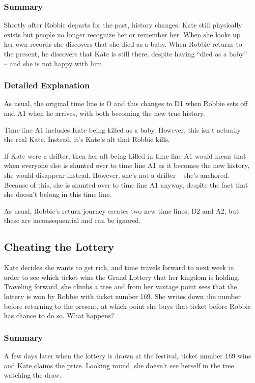 \begin{multicols*}{2}
\subsubsection{Summary}
Shortly after Robbie departs for the past, history changes. Kate still physically exists but people no longer recognize her or remember her. When she looks up her own records she discovers that she died as a baby. When Robbie returns to the present, he discovers that Kate is still there, despite having “died as a baby” – and she is not happy with him.

\subsubsection{Detailed Explanation}
As usual, the original time line is O and this changes to D1 when Robbie sets off and A1 when he arrives, with both becoming the new true history.

Time line A1 includes Kate being killed as a baby. However, this isn’t actually the real Kate. Instead, it’s Kate’s alt that Robbie kills.

If Kate were a drifter, then her alt being killed in time line A1 would mean that when everyone else is shunted over to time line A1 as it becomes the new history, she would disappear instead. However, she’s not a drifter – she’s anchored. Because of this, she is shunted over to time line A1 anyway, despite the fact that she doesn’t belong in this time line.

As usual, Robbie’s return journey creates two new time lines, D2 and A2, but these are inconsequential and can be ignored.

\subsection{Cheating the Lottery}
Kate decides she wants to get rich, and time travels forward to next week in order to see which ticket wins the Grand Lottery that her kingdom is holding. Traveling forward, she climbs a tree and from her vantage point sees that the lottery is won by Robbie with ticket number 169. She writes down the number before returning to the present, at which point she buys that ticket before Robbie has chance to do so. What happens? 

\subsubsection{Summary}
A few days later when the lottery is drawn at the festival, ticket number 169 wins and Kate claims the prize. Looking round, she doesn’t see herself in the tree watching the draw.


\end{multicols*}
